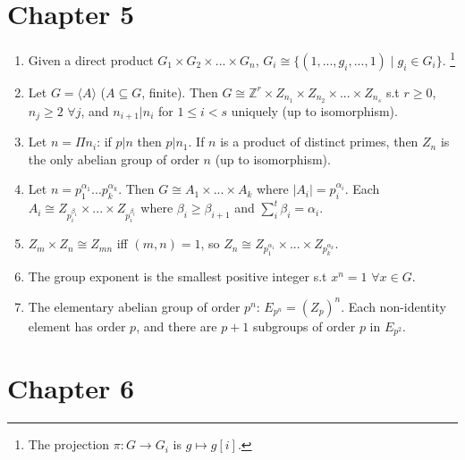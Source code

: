 \documentclass{article}
\begin{document}
\section*{Chapter 5}

\begin{enumerate}[1.]
    \item Given a direct product $G_1 \times G_2 \times ... \times G_n$,
        $G_i \cong \{(1, ..., g_i, ..., 1) \mid g_i \in G_i\}$.
        \footnote{The projection $\pi : G \rightarrow G_i$ is $g \mapsto
        g[i]$.}
    \item Let $G = \langle A \rangle$ ($A \subseteq G$, finite). Then $G \cong
        \mathbb{Z}^r \times Z_{n_1} \times Z_{n_2} \times ... \times
        Z_{n_s}$ s.t $r \geq 0$, $n_j \geq 2$ $\forall j$, and $n_{i+1} |
        n_i$ for $1 \leq i < s$ uniquely (up to isomorphism).
    \item Let $n = \Pi n_i$: if $p | n$ then $p | n_1$. If $n$ is a product
        of distinct primes, then $Z_n$ is the only abelian group of order
        $n$ (up to isomorphism).
    \item Let $n = p_1^{\alpha_1}...p_k^{\alpha_k}$. Then $G \cong A_1
        \times ... \times A_k$ where $|A_i| = p_i^{\alpha_i}$. Each $A_i
        \cong Z_{p_i^{\beta_1}} \times ... \times Z_{p_i^{\beta_t}}$ where
        $\beta_i \geq \beta_{i+1}$ and $\sum_i^t \beta_i = \alpha_i$.
    \item $Z_m \times Z_n \cong Z_{mn}$ iff $(m, n) = 1$, so $Z_n \cong
        Z_{p_1^{\alpha_1}} \times ... \times Z_{p_k^{\alpha_k}}$.
    \item The group exponent is the smallest positive integer s.t $x^n = 1$
        $\forall x \in G$.
    \item The elementary abelian group of order $p^n$: $E_{p^n}= (Z_p)^n$.
        Each non-identity element has order $p$, and there are $p+1$
        subgroups of order $p$ in $E_{p^2}$.
\end{enumerate}

\section*{Chapter 6}
\end{document}
